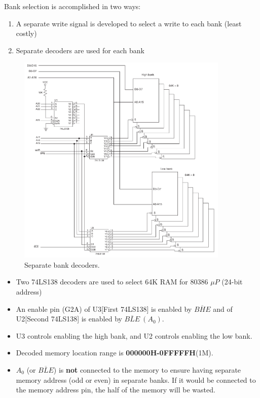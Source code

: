 Bank selection is accomplished in two ways:
\begin{enumerate}
  \item A separate write signal is developed to select a write to each bank (least costly)
  \item Separate decoders are used for each bank
\end{enumerate}


\begin{figure}[h!]
  \includegraphics[width = 0.9\textwidth]{./figures/Bank_Separate.png}
  \caption{Separate bank decoders.}
  \label{}
\end{figure}
\begin{itemize}
  \item Two 74LS138 decoders are used to select 64K RAM for 80386 $\mu P$ (24-bit address)
  \item An enable pin (G2A) of U3[First 74LS138] is enabled by $\overline{BHE}$ and of U2[Second 74LS138] is enabled by $\overline{BLE}~(A_0)$.
  \item U3 controls enabling the high bank, and U2 controls enabling the low bank.
  \item Decoded memory location range is \textbf{000000H-0FFFFFH}(1M).
  \item $A_0$ (or $\overline{BLE}$) is \textbf{not} connected to the memory to ensure having separate memory address (odd  or even) in separate banks. If it would be connected to the memory address pin, the half of the memory will be wasted.
\end{itemize}

